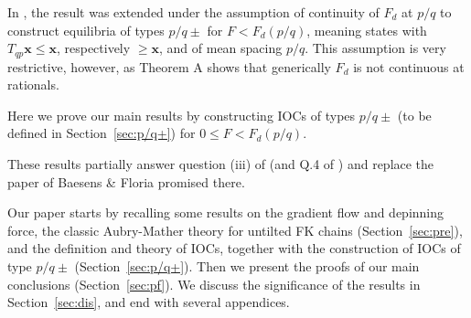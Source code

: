\documentclass[12pt]{article}
\newcommand{\refer}[1]{~(\ref{#1})}
\newcommand{\xbf}{{\mathbf{x}}}
\begin{document}
In \cite{QW2}, the result was extended under the assumption of continuity of $F_d$ at $p/q$ to construct equilibria of types $p/q\pm$ for $F<F_d(p/q)$, meaning states with $T_{qp}\xbf\le \xbf$, respectively $\ge \xbf$, and of mean spacing $p/q$.
This assumption is very restrictive, however, as Theorem A shows that generically $F_d$ is not continuous at rationals. 

Here we prove our main results by constructing IOCs of types $p/q\pm$ (to be defined in Section~\ref{sec:p/q+}) for $0\leq F< F_d(p/q)$.

These results partially answer question (iii) of \cite{BM} (and Q.4 of \cite{B}) and replace the paper of Baesens \& Floria promised there.

Our paper starts by recalling some results on the gradient flow and depinning force, the classic Aubry-Mather theory for untilted FK chains (Section~\ref{sec:pre}), and the definition and theory of IOCs, together with the construction of IOCs of type $p/q\pm$ (Section~\ref{sec:p/q+}).  Then we present the proofs of our main conclusions (Section~\ref{sec:pf}). %
 We discuss the significance of the results in Section~\ref{sec:dis}, and end with several appendices. %

\end{document}
